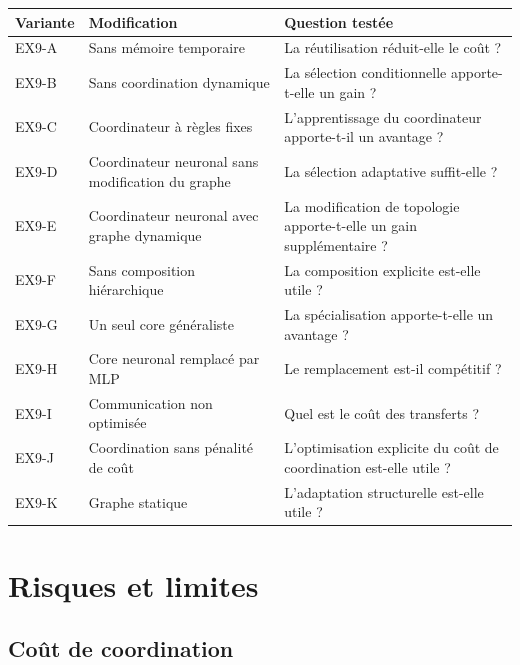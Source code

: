\documentclass[11pt,a4paper]{article}
\begin{document}
\begin{longtable}{p{2.7cm}p{4.0cm}p{6.0cm}}
\toprule
Variante & Modification & Question testée \\
\midrule

EX9-A
& Sans mémoire temporaire
& La réutilisation réduit-elle le coût ? \\

EX9-B
& Sans coordination dynamique
& La sélection conditionnelle apporte-t-elle un gain ? \\

EX9-C
& Coordinateur à règles fixes
& L'apprentissage du coordinateur apporte-t-il un avantage ? \\

EX9-D
& Coordinateur neuronal sans modification du graphe
& La sélection adaptative suffit-elle ? \\

EX9-E
& Coordinateur neuronal avec graphe dynamique
& La modification de topologie apporte-t-elle un gain supplémentaire ? \\

EX9-F
& Sans composition hiérarchique
& La composition explicite est-elle utile ? \\

EX9-G
& Un seul core généraliste
& La spécialisation apporte-t-elle un avantage ? \\

EX9-H
& Core neuronal remplacé par MLP
& Le remplacement est-il compétitif ? \\

EX9-I
& Communication non optimisée
& Quel est le coût des transferts ? \\

EX9-J
& Coordination sans pénalité de coût
& L'optimisation explicite du coût de coordination est-elle utile ? \\

EX9-K
& Graphe statique
& L'adaptation structurelle est-elle utile ? \\

\bottomrule
\end{longtable}

\section{Risques et limites}

\subsection{Coût de coordination}
\end{document}
